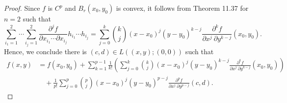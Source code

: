 \begin{Exercise}
\begin{proof}
Since $f$ is $C^p$ and $B_r(x_0, y_0)$ is convex, it follows from Theorem 11.37 for $n=2$ such that
$$
\sum_{i_1=1}^{2}\cdots\sum_{i_j=1}^{2}\frac{\partial^j f}{\partial x_{i_1}\cdots\partial x_{i_j}} h_{i_1}\cdots h_{i_j}
= \sum_{j=0}^{k}\binom{k}{j}(x-x_0)^j (y-y_0)^{k-j}\frac{\partial^k f}{\partial x^j\ \partial y^{k-j}}(x_0,y_0).
$$
Hence, we conclude there is $(c,d)\in L\left( (x,y);(0,0) \right)$ such that 
\begin{align*}
f(x,y) 
&= f(x_0,y_0)+\sum_{k=1}^{p-1}\frac{1}{k!}\left( \sum_{j=0}^{k} \binom{k}{j}(x-x_0)^j (y-y_0)^{k-j} \frac{\partial^k f}{\partial x^j\ \partial y^{k-j}}(x_0,y_0) \right) \\
&\quad + \frac{1}{p!}\sum_{j=0}^{p}\binom{p}{j}(x-x_0)^j (y-y_0)^{p-j} \frac{\partial^p f}{\partial x^j\ \partial y^{p-j}} (c,d).
\end{align*}
\end{proof}
\end{Exercise}